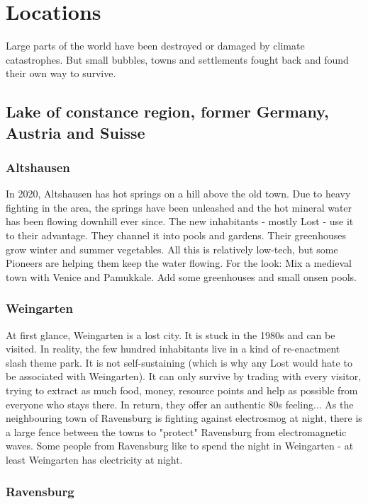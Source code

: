 \chapter{Locations}

Large parts of the world have been destroyed or damaged by climate catastrophes. But small bubbles, towns and settlements fought back and found their own way to survive.

\section{Lake of constance region, former Germany, Austria and Suisse}

\subsection{Altshausen}

In 2020, Altshausen has hot springs on a hill above the old town. Due to heavy fighting in the area, the springs have been unleashed and the hot mineral water has been flowing downhill ever since. The new inhabitants - mostly Lost - use it to their advantage.
They channel it into pools and gardens. Their greenhouses grow winter and summer vegetables.
All this is relatively low-tech, but some Pioneers are helping them keep the water flowing. For the look: Mix a medieval town with Venice and Pamukkale. Add some greenhouses and small onsen pools.


\subsection{Weingarten}

At first glance, Weingarten is a lost city. It is stuck in the 1980s and can be visited. In reality, the few hundred inhabitants live in a kind of re-enactment slash theme park. It is not self-sustaining (which is why any Lost would hate to be associated with Weingarten).
It can only survive by trading with every visitor, trying to extract as much food, money, resource points and help as possible from everyone who stays there. In return, they offer an authentic 80s feeling...
As the neighbouring town of Ravensburg is fighting against electrosmog at night, there is a large fence between the towns to "protect" Ravensburg from electromagnetic waves.
Some people from Ravensburg like to spend the night in Weingarten - at least Weingarten has electricity at night.


\subsection{Ravensburg}

